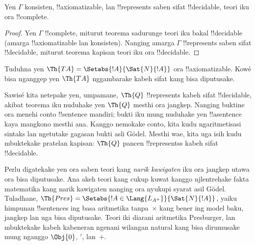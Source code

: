 \documentclass[../../../include/open-logic-section]{subfiles}
\begin{document}
\begin{cor}
Yen $\Gamma$ konsisten, !!{axiomatizable},
lan !!{represents} saben sifat !!{decidable},
teori iku ora !!{complete}.
\end{cor}

\begin{proof}
Yen $\Gamma$ !!{complete}, miturut teorema
sadurunge teori iku bakal !!{decidable}
(amarga !!{axiomatizable} lan konsisten).
Nanging amarga $\Gamma$ !!{represents}
saben sifat !!{decidable}, miturut teorema
kapisan teori iku ora !!{decidable}.
\end{proof}

\begin{prob}
Tuduhna yen $\Th{TA} = \Setabs{!A}{\Sat{N}{!A}}$
ora !!{axiomatizable}. Kowé bisa nganggep
yen $\Th{TA}$ nggambarake kabeh sifat
kang bisa diputusake.
\end{prob}

Sawisé kita netepake yen, umpamane, $\Th{Q}$
!!{represents} kabeh sifat !!{decidable},
akibat teorema iku nuduhake yen $\Th{Q}$
mesthi ora jangkep. Nanging buktine ora
menehi conto !!{sentence} mandiri; bukti iku
mung nuduhake yen !!a{sentence} kaya
mangkono mesthi ana. Kanggo nemokake conto,
kita kudu ngaritmetisasi sintaks lan ngetutake
gagasan bukti asli G\"odel. Mesthi wae, kita
uga isih kudu mbuktekake pratelan kapisan:
$\Th{Q}$ pancen !!{represents}s kabeh sifat
!!{decidable}.

Perlu digatekake yen ora saben teori kang
\emph{narik kawigaten} iku ora jangkep utawa
ora bisa diputusake. Ana akeh teori kang
cukup kuwat kanggo njlentrehake fakta
matematika kang narik kawigaten nanging
ora nyukupi syarat asil G\"odel. Tuladhane,
$\Th{Pres} = \Setabs{!A \in \Lang{L_{A^+}}}{\Sat{N}{!A}}$,
yaiku himpunan !!{sentence}s ing basa
aritmetika tanpa~$\times$ kang bener ing
model baku, jangkep lan uga bisa diputusake.
Teori iki diarani aritmetika Presburger,
lan mbuktekake kabeh kabeneran ngenani
wilangan natural kang bisa dirumusake mung
nganggo $\Obj{0}$, $\prime$, lan~$+$.
\end{document}
